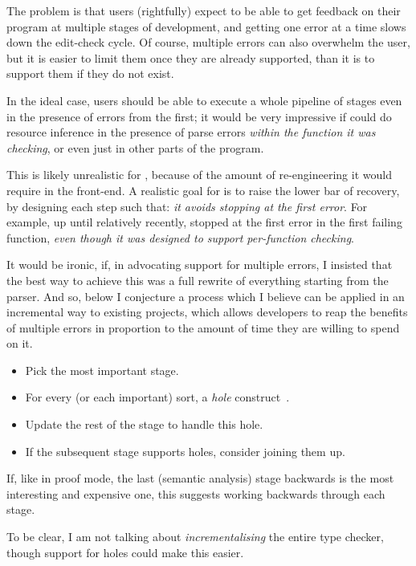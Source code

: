 The problem is that users (rightfully) expect to be able to get feedback on
their program at multiple stages of development, and getting one error at a
time slows down the edit-check cycle. Of course, multiple errors can also
overwhelm the user, but it is easier to limit them once they are already
supported, than it is to support them if they do not exist.

In the ideal case, users should be able to execute a whole pipeline of stages
even in the presence of errors from the first; it would be very impressive if
 could do resource inference in the presence of parse errors
\emph{within the function it was checking}, or even just in other parts of the
program.

This is likely unrealistic for , because of the amount of re-engineering
it would require in the  front-end. A realistic goal for 
is to raise the lower bar of recovery, by designing each step such that:
\emph{it avoids stopping at the first error}. For example, up until relatively
recently,  stopped at the first error in the first failing function,
\emph{even though it was designed to support per-function checking}.

It would be ironic, if, in advocating support for multiple errors, I insisted
that the best way to achieve this was a full rewrite of everything starting
from the parser. And so, below I conjecture a process which I believe can be
applied in an incremental way to existing projects, which allows developers
to reap the benefits of multiple errors in proportion to the amount of
time they are willing to spend on it.
\begin{itemize}
    \item Pick the most important stage.
    \item For every (or each important) sort, a \emph{hole}
        construct~.
    \item Update the rest of the stage to handle this hole.
    \item If the subsequent stage supports holes, consider joining them up.
\end{itemize}
If, like in  proof mode, the last (semantic analysis) stage backwards is
the most interesting and expensive one, this suggests working backwards through
each stage.

To be clear, I am not talking about \emph{incrementalising} the entire type
checker, though support for holes could make this easier.

